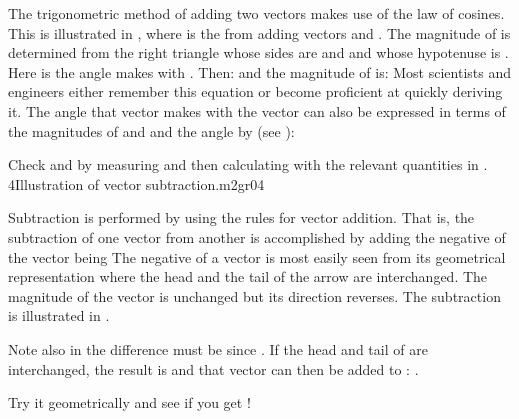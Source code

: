 {
The trigonometric method of adding two vectors makes use of the law of cosines.
This is illustrated in , where  is the  from
adding vectors  and .
The magnitude of  is determined from the right triangle whose
sides are  and  and whose hypotenuse is .
Here \m{\phi} is the angle  makes with .
Then:
%
%
and the magnitude of  is:
%
%
Most scientists and engineers either remember this equation or become
proficient at quickly deriving it.
%
%
The angle that vector  makes with the vector  can also be
expressed in terms of the magnitudes of  and  and the angle
\m{\phi} by (see ):
%
%

%
\tryit Check  and  by measuring and
%
then calculating with the relevant quantities in . 
%
%
                          {4}{Illustration of vector subtraction.}{m2gr04}

Subtraction is performed by using the rules for vector addition.
That is, the subtraction of one vector from another is accomplished by adding
the negative of the vector being 
The negative of a vector is most easily seen from its geometrical
representation where the head and the tail of the arrow are interchanged.
The magnitude of the vector is unchanged but its direction reverses.
The subtraction  is illustrated in .

Note also in  the difference  must be 
since .
If the head and tail of  are interchanged, the result is 
and that vector can then be added to : .

\tryit Try it geometrically and see if you get !
}%
%
